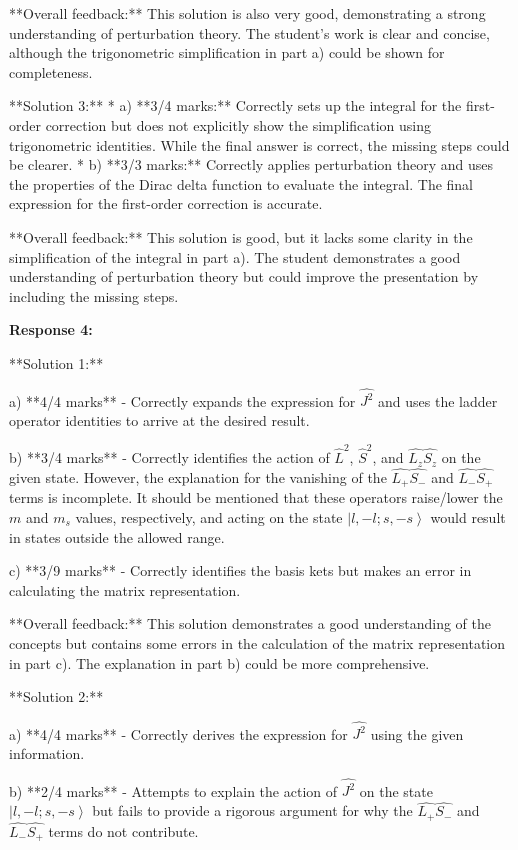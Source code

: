 \documentclass[a4paper,11pt]{article}
\begin{document}
**Overall feedback:** This solution is also very good, demonstrating a strong understanding of perturbation theory. The student's work is clear and concise, although the trigonometric simplification in part a) could be shown for completeness.

**Solution 3:**
* a) **3/4 marks:** Correctly sets up the integral for the first-order correction but does not explicitly show the simplification using trigonometric identities. While the final answer is correct, the missing steps could be clearer.
* b) **3/3 marks:** Correctly applies perturbation theory and uses the properties of the Dirac delta function to evaluate the integral. The final expression for the first-order correction is accurate.

**Overall feedback:** This solution is good, but it lacks some clarity in the simplification of the integral in part a). The student demonstrates a good understanding of perturbation theory but could improve the presentation by including the missing steps.

\textbf{Response 4:}

**Solution 1:**

a) **4/4 marks** - Correctly expands the expression for \( \hat{J^2} \) and uses the ladder operator identities to arrive at the desired result.

b) **3/4 marks** - Correctly identifies the action of \( \hat{L}^2 \), \( \hat{S}^2 \), and \( \hat{L_z}\hat{S_z} \) on the given state. However, the explanation for the vanishing of the \( \hat{L_+}\hat{S_-} \) and \( \hat{L_-}\hat{S_+} \) terms is incomplete. It should be mentioned that these operators raise/lower the \( m \) and \( m_s \) values, respectively, and acting on the state \( \left|l, -l; s, -s \right> \) would result in states outside the allowed range.

c) **3/9 marks** - Correctly identifies the basis kets but makes an error in calculating the matrix representation.

**Overall feedback:** This solution demonstrates a good understanding of the concepts but contains some errors in the calculation of the matrix representation in part c). The explanation in part b) could be more comprehensive.

**Solution 2:**

a) **4/4 marks** - Correctly derives the expression for \( \hat{J^2} \) using the given information.

b) **2/4 marks** - Attempts to explain the action of \( \hat{J^2} \) on the state \( \left|l, -l; s, -s \right> \) but fails to provide a rigorous argument for why the \( \hat{L_+}\hat{S_-} \) and \( \hat{L_-}\hat{S_+} \) terms do not contribute.
\end{document}
